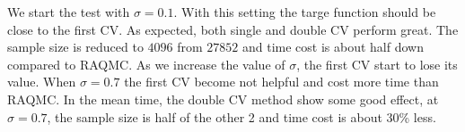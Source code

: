 We start the test with $\sigma=0.1$. 
With this setting the targe function should be close to the first CV. 
As expected, both single and double CV perform great. The sample size is reduced to $4096$ from $27852$ and time cost is about half down compared to RAQMC. 
As we increase the value of $\sigma$, the first CV start to lose its value. 
When $\sigma=0.7$ the first CV become not helpful and cost more time than RAQMC. In the mean time, the double CV method show some good effect, at $\sigma=0.7$, the sample size is half of the other 2 and time cost is about 30\% less.

